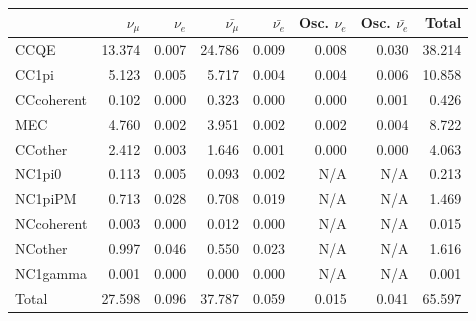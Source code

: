 
\begin{table}
\center
\begin{tabular} { | l ||r | r | r | r | r | r | | r | }
\hline

              & $\nu_\mu$            & $\nu_e$              & $\bar{\nu_\mu}$      & $\bar{\nu_e}$        & Osc. $\nu_e$         & Osc. $\bar{\nu_e}$   & Total                \\ \hline\hline
              
 CCQE         & 13.374               & 0.007                & 24.786               & 0.009                & 0.008                & 0.030                & 38.214               \\ \hline
 CC1pi        & 5.123                & 0.005                & 5.717                & 0.004                & 0.004                & 0.006                & 10.858               \\ \hline
 CCcoherent   & 0.102                & 0.000                & 0.323                & 0.000                & 0.000                & 0.001                & 0.426                \\ \hline
 MEC          & 4.760                & 0.002                & 3.951                & 0.002                & 0.002                & 0.004                & 8.722                \\ \hline
 CCother      & 2.412                & 0.003                & 1.646                & 0.001                & 0.000                & 0.000                & 4.063                \\ \hline
 NC1pi0       & 0.113                & 0.005                & 0.093                & 0.002                & N/A                  & N/A                  & 0.213                \\ \hline
 NC1piPM      & 0.713                & 0.028                & 0.708                & 0.019                & N/A                  & N/A                  & 1.469                \\ \hline
 NCcoherent   & 0.003                & 0.000                & 0.012                & 0.000                & N/A                  & N/A                  & 0.015                \\ \hline
 NCother      & 0.997                & 0.046                & 0.550                & 0.023                & N/A                  & N/A                  & 1.616                \\ \hline
 NC1gamma     & 0.001                & 0.000                & 0.000                & 0.000                & N/A                  & N/A                  & 0.001                \\ \hline
\hline
 Total        & 27.598               & 0.096                & 37.787               & 0.059                & 0.015                & 0.041                & 65.597               \\ \hline


\end{tabular}
\end{table}
